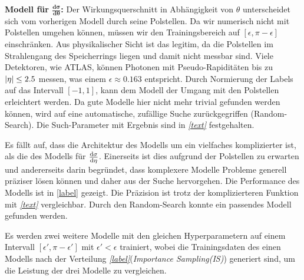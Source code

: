 \textbf{Modell für $\mathbf{\frac{d\sigma}{d\theta}}$:} %
Der Wirkungsquerschnitt in Abhängigkeit von $\theta$ unterscheidet sich vom vorherigen Modell durch seine Polstellen. Da wir numerisch nicht mit Polstellen umgehen können, müssen wir den Trainingsbereich auf $[\epsilon, \pi-\epsilon]$ einschränken. Aus physikalischer Sicht ist das legitim, da die Polstellen im Strahlengang des Speicherrings liegen und damit nicht messbar sind. Viele Detektoren, wie ATLAS, können Photonen mit Pseudo-Rapiditäten bis zu $\abs{\eta} \leq 2.5$ messen, was einem $\epsilon \approx 0.163$ entspricht. Durch Normierung der Labels auf das Intervall $[-1, 1]$, kann dem Modell der Umgang mit den Polstellen erleichtert werden. Da gute Modelle hier nicht mehr trivial gefunden werden können, wird auf eine automatische, zufällige Suche zurückgegriffen (Random-Search). Die Such-Parameter mit Ergebnis sind in \textit{\autoref{text}} festgehalten.

Es fällt auf, dass die Architektur des Modells um ein vielfaches komplizierter ist, als die des Modells für $\derivative{\sigma}{\eta}$. Einerseits ist dies aufgrund der Polstellen zu erwarten und andererseits darin begründet, dass komplexere Modelle Probleme generell präziser lösen können und daher aus der Suche hervorgehen. Die Performance des Modells ist in \textit{}\autoref{label} gezeigt. Die Präzision ist trotz der komplizierteren Funktion mit \textit{\autoref{text}} vergleichbar. Durch den Random-Search konnte ein passendes Modell gefunden werden. %

Es werden zwei weitere Modelle mit den gleichen Hyperparametern auf einem Intervall $[\epsilon', \pi-\epsilon']$ mit $\epsilon' < \epsilon$ trainiert, wobei die Trainingsdaten des einen Modells nach der Verteilung \textit{\autoref{label}}(\textit{Importance Sampling(IS)}) generiert sind, um die Leistung der drei Modelle zu vergleichen.

